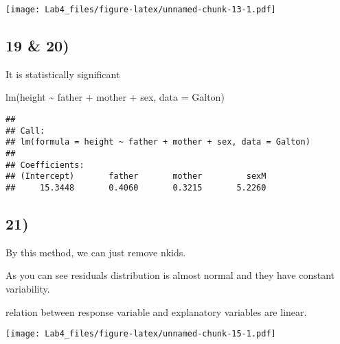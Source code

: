 \documentclass[
]{article}
\newenvironment{Shaded}{\begin{snugshade}}{\end{snugshade}}
\newcommand{\AttributeTok}[1]{\textcolor[rgb]{0.77,0.63,0.00}{#1}}
\newcommand{\FunctionTok}[1]{\textcolor[rgb]{0.00,0.00,0.00}{#1}}
\newcommand{\NormalTok}[1]{#1}
\newcommand{\OtherTok}[1]{\textcolor[rgb]{0.56,0.35,0.01}{#1}}
\newcommand{\SpecialCharTok}[1]{\textcolor[rgb]{0.00,0.00,0.00}{#1}}
\begin{document}
\texttt{[image: Lab4\_files/figure-latex/unnamed-chunk-13-1.pdf]}

\hypertarget{section-18}{%
\subsection{19 \& 20)}\label{section-18}}

It is statistically significant

\begin{Shaded}
\begin{Highlighting}[]
\FunctionTok{lm}\NormalTok{(height }\SpecialCharTok{\textasciitilde{}}\NormalTok{ father }\SpecialCharTok{+}\NormalTok{ mother }\SpecialCharTok{+}\NormalTok{ sex, }\AttributeTok{data =}\NormalTok{ Galton)}
\end{Highlighting}
\end{Shaded}

\begin{verbatim}
## 
## Call:
## lm(formula = height ~ father + mother + sex, data = Galton)
## 
## Coefficients:
## (Intercept)       father       mother         sexM  
##     15.3448       0.4060       0.3215       5.2260
\end{verbatim}

\hypertarget{section-19}{%
\subsection{21)}\label{section-19}}

By this method, we can just remove nkids.

As you can see residuals distribution is almost normal and they have
constant variability.

relation between response variable and explanatory variables are linear.

\begin{Shaded}
\end{Shaded}

\texttt{[image: Lab4\_files/figure-latex/unnamed-chunk-15-1.pdf]}
\end{document}
